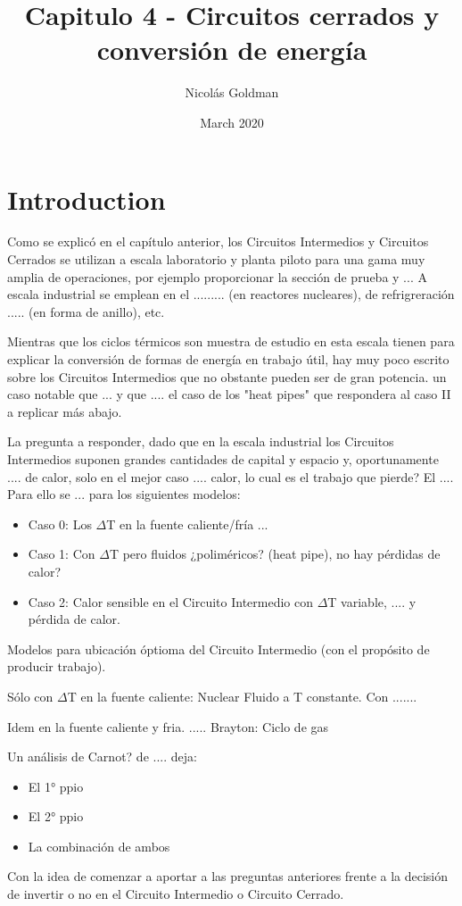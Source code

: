 \documentclass{article}
\title{Capitulo 4 - Circuitos cerrados y conversión de energía}
\author{Nicolás Goldman}
\date{March 2020}
\begin{document}
\maketitle

\section{Introduction}
Como se explicó en el capítulo anterior, los Circuitos Intermedios y Circuitos Cerrados se utilizan a escala laboratorio y planta piloto para una gama muy amplia de operaciones, por ejemplo proporcionar la sección de prueba y ...
A escala industrial se emplean en el ......... (en reactores nucleares), de refrigreración ..... (en forma de anillo), etc.

Mientras que los ciclos térmicos son muestra de estudio en esta escala tienen para explicar la conversión de formas de energía en trabajo útil, hay muy poco escrito sobre los Circuitos Intermedios que no obstante pueden ser de gran potencia. un caso notable que ... y que .... el caso de los "heat pipes" que respondera al caso II a replicar más abajo.

La pregunta a responder, dado que en la escala industrial los Circuitos Intermedios suponen grandes cantidades de capital y espacio y, oportunamente .... de calor, solo en el mejor caso .... calor, lo cual es el trabajo que pierde? El ....
Para ello se ... para los siguientes modelos:
\begin{itemize}
    \item Caso 0: Los $\Delta$T en la fuente caliente/fría ...
    \item Caso 1: Con $\Delta$T pero fluidos ¿poliméricos? (heat pipe), no hay pérdidas de calor?
    \item Caso 2: Calor sensible en el Circuito Intermedio con $\Delta$T variable, .... y pérdida de calor.
\end{itemize}

Modelos para ubicación óptioma del Circuito Intermedio (con el propósito de producir trabajo).

Sólo con $\Delta$T en la fuente caliente: Nuclear Fluido a T constante. Con .......

Idem en la fuente caliente y fria. ..... Brayton: Ciclo de gas

Un análisis de Carnot? de .... deja:
\begin{itemize}
    \item El 1° ppio
    \item El 2° ppio
    \item La combinación de ambos
\end{itemize}
Con la idea de comenzar a aportar a las preguntas anteriores frente a la decisión de invertir o no en el Circuito Intermedio o Circuito Cerrado.
\end{document}
